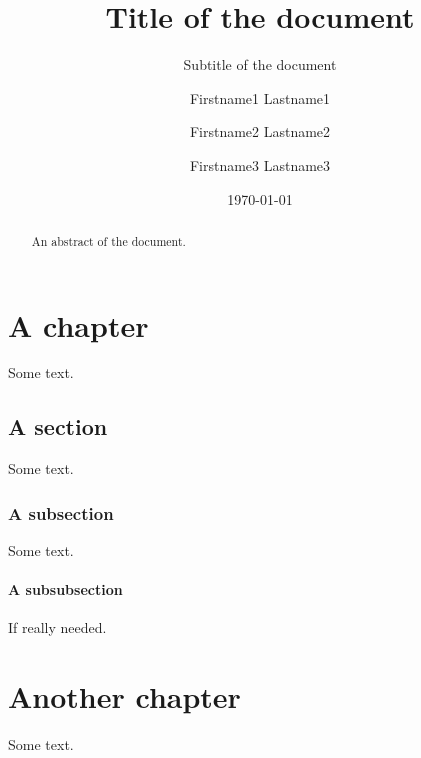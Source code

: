 \documentclass[%
	paper=portrait,%
	paper=A4,%
	fontsize=11pt,%
	english,%
]{scrreprt}
\title{Title of the document}
\subtitle{Subtitle of the document}
\author{Firstname1 Lastname1 \and Firstname2 Lastname2 \and Firstname3 Lastname3}
\date{\today}
\begin{document}

\maketitle


\begin{abstract}
	An abstract of the document.
\end{abstract}


\tableofcontents


\chapter{A chapter}

	Some text.
	
	
	\section{A section}
	
		Some text.
		
		
		\subsection{A subsection}
		
			Some text.
			
			
			\subsubsection{A subsubsection}
			
				If really needed.



\chapter{Another chapter}

	Some text.
	
	
\end{document}
